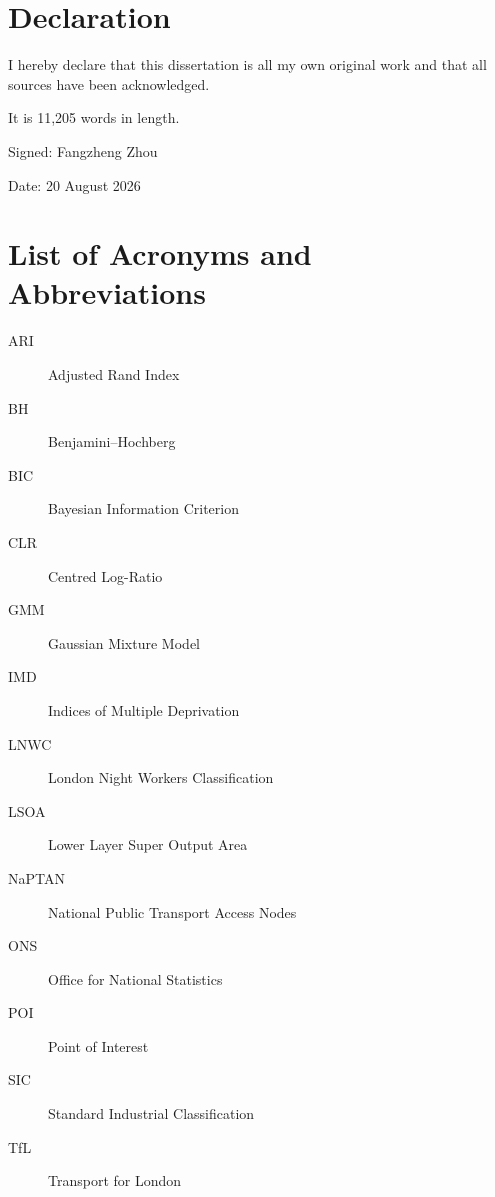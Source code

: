 \chapter*{Declaration}
I hereby declare that this dissertation is all my own original work and that all sources have been acknowledged.

It is 11,205 words in length.

\vspace{2\baselineskip}
Signed: Fangzheng Zhou

Date: 20 August 2026

\setcounter{tocdepth}{2}

\begingroup
\singlespacing
\setlength{\parskip}{0pt}
\tableofcontents
\listoffigures
\listoftables
\endgroup

\chapter*{List of Acronyms and Abbreviations}
\begin{description}
\item[ARI] Adjusted Rand Index
\item[BH] Benjamini--Hochberg
\item[BIC] Bayesian Information Criterion
\item[CLR] Centred Log-Ratio
\item[GMM] Gaussian Mixture Model
\item[IMD] Indices of Multiple Deprivation
\item[LNWC] London Night Workers Classification
\item[LSOA] Lower Layer Super Output Area
\item[NaPTAN] National Public Transport Access Nodes
\item[ONS] Office for National Statistics
\item[POI] Point of Interest
\item[SIC] Standard Industrial Classification
\item[TfL] Transport for London
\end{description}

